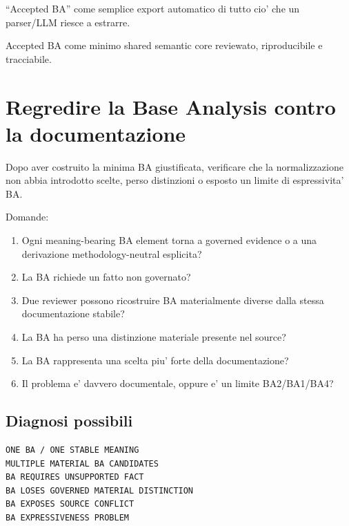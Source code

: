 \documentclass[11pt,a4paper]{article}
\begin{document}
\begin{badbox}
``Accepted BA'' come semplice export automatico di tutto cio' che un parser/LLM riesce a estrarre.
\end{badbox}

\begin{goodbox}
Accepted BA come minimo shared semantic core reviewato, riproducibile e tracciabile.
\end{goodbox}


\section{Regredire la Base Analysis contro la documentazione}

\begin{statusworking}
Dopo aver costruito la minima BA giustificata, verificare che la normalizzazione non abbia introdotto scelte, perso distinzioni o esposto un limite di espressivita' BA.
\end{statusworking}

Domande:

\begin{enumerate}
\item Ogni meaning-bearing BA element torna a governed evidence o a una derivazione methodology-neutral esplicita?
\item La BA richiede un fatto non governato?
\item Due reviewer possono ricostruire BA materialmente diverse dalla stessa documentazione stabile?
\item La BA ha perso una distinzione materiale presente nel source?
\item La BA rappresenta una scelta piu' forte della documentazione?
\item Il problema e' davvero documentale, oppure e' un limite BA2/BA1/BA4?
\end{enumerate}

\subsection{Diagnosi possibili}

\begin{lstlisting}
ONE BA / ONE STABLE MEANING
MULTIPLE MATERIAL BA CANDIDATES
BA REQUIRES UNSUPPORTED FACT
BA LOSES GOVERNED MATERIAL DISTINCTION
BA EXPOSES SOURCE CONFLICT
BA EXPRESSIVENESS PROBLEM
\end{lstlisting}
\end{document}
